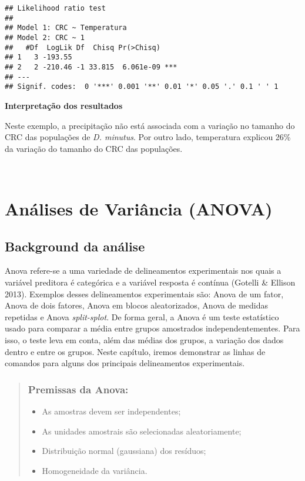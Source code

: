 \documentclass[
]{book}
\providecommand{\tightlist}{%
  \setlength{\itemsep}{0pt}\setlength{\parskip}{0pt}}
\begin{document}
\begin{verbatim}
## Likelihood ratio test
## 
## Model 1: CRC ~ Temperatura
## Model 2: CRC ~ 1
##   #Df  LogLik Df  Chisq Pr(>Chisq)    
## 1   3 -193.55                         
## 2   2 -210.46 -1 33.815  6.061e-09 ***
## ---
## Signif. codes:  0 '***' 0.001 '**' 0.01 '*' 0.05 '.' 0.1 ' ' 1
\end{verbatim}

\textbf{Interpretação dos resultados}

Neste exemplo, a precipitação não está associada com a variação no tamanho do CRC das populações de \emph{D. minutus}. Por outro lado, temperatura explicou 26\% da variação do tamanho do CRC das populações.

~

\hypertarget{anuxe1lises-de-variuxe2ncia-anova}{%
\section{Análises de Variância (ANOVA)}\label{anuxe1lises-de-variuxe2ncia-anova}}

\hypertarget{background-da-anuxe1lise-5}{%
\subsection{Background da análise}\label{background-da-anuxe1lise-5}}

Anova refere-se a uma variedade de delineamentos experimentais nos quais a variável preditora é categórica e a variável resposta é contínua (Gotelli \& Ellison 2013). Exemplos desses delineamentos experimentais são: Anova de um fator, Anova de dois fatores, Anova em blocos aleatorizados, Anova de medidas repetidas e Anova \emph{split-splot}. De forma geral, a Anova é um teste estatístico usado para comparar a média entre grupos amostrados independentementes. Para isso, o teste leva em conta, além das médias dos grupos, a variação dos dados dentro e entre os grupos. Neste capítulo, iremos demonstrar as linhas de comandos para alguns dos principais delineamentos experimentais.

\begin{quote}
\hypertarget{premissas-da-anova}{%
\subsubsection{Premissas da Anova:}\label{premissas-da-anova}}

\begin{itemize}
\tightlist
\item
  As amostras devem ser independentes;
\item
  As unidades amostrais são selecionadas aleatoriamente;
\item
  Distribuição normal (gaussiana) dos resíduos;
\item
  Homogeneidade da variância.
\end{itemize}
\end{quote}
\end{document}
